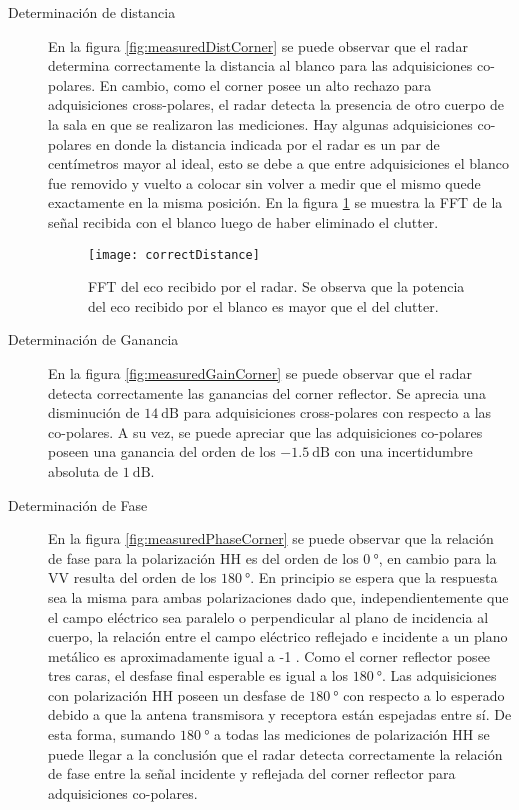 \begin{description}
  \item[Determinación de distancia] En la figura \ref{fig:measuredDistCorner} se puede observar que el radar determina correctamente la distancia al blanco para las adquisiciones co-polares. En cambio, como el corner posee un alto rechazo para adquisiciones cross-polares, el radar detecta la presencia de otro cuerpo de la sala en que se realizaron las mediciones. Hay algunas adquisiciones co-polares en donde la distancia indicada por el radar es un par de centímetros mayor al ideal, esto se debe a que entre adquisiciones el blanco fue removido y vuelto a colocar sin volver a medir que el mismo quede exactamente en la misma posición. En la figura \ref{fig:correctDistance} se muestra la FFT de la señal recibida con el blanco luego de haber eliminado el clutter.

  \begin{figure}[H]
    \centering
    \texttt{[image: correctDistance]}
    \caption{FFT del eco recibido por el radar. Se observa que la potencia del eco recibido por el blanco es mayor que el del clutter.}
    \label{fig:correctDistance}
  \end{figure}

  \item[Determinación de Ganancia] En la figura \ref{fig:measuredGainCorner} se puede observar que el radar detecta correctamente las ganancias del corner reflector. Se aprecia una disminución de $\SI{14}{\dB}$ para adquisiciones cross-polares con respecto a las co-polares. A su vez, se puede apreciar que las adquisiciones co-polares poseen una ganancia del orden de los $\SI{-1.5}{\dB}$ con una incertidumbre absoluta de $\SI{1}{\dB}$.

  \item[Determinación de Fase] En la figura \ref{fig:measuredPhaseCorner} se puede observar que la relación de fase para la polarización HH es del orden de los $\SI{0}{\degree}$, en cambio para la VV resulta del orden de los $\SI{180}{\degree}$. En principio se espera que la respuesta sea la misma para ambas polarizaciones dado que, independientemente que el campo eléctrico sea paralelo o perpendicular al plano de incidencia al cuerpo, la relación entre el campo eléctrico reflejado e incidente a un plano metálico es aproximadamente igual a -1 \cite{Michelson1993}. Como el corner reflector posee tres caras, el desfase final esperable es igual a los $\SI{180}{\degree}$. Las adquisiciones con polarización HH poseen un desfase de $\SI{180}{\degree}$ con respecto a lo esperado debido a que la antena transmisora y receptora están espejadas entre sí. De esta forma, sumando $\SI{180}{\degree}$ a todas las mediciones de polarización HH se puede llegar a la conclusión que el radar detecta correctamente la relación de fase entre la señal incidente y reflejada del corner reflector para adquisiciones co-polares.


\end{description}
